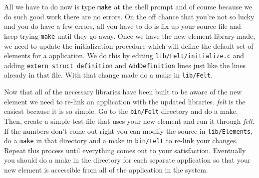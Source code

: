 All we have to do now is type {\tt make} at the shell prompt and of course
because we do such good work there are no errors.  On the off chance
that you're not so lucky and you do have a few errors, all you have to do is 
fix up your source file and keep trying {\tt make} until they go away.
Once we have the new element library made, we need to update the initialization
procedure which will define the default set of elements for a \felt{} 
application.  We do this by editing \mbox{\tt lib/Felt/initialize.c} and 
adding {\tt extern struct definition} and {\tt AddDefinition} lines just
like the lines already in that file.  With that change made do a make
in \mbox{\tt lib/Felt}.

Now that all of the necessary libraries have been built to be aware of the 
new element we need to re-link an application with the updated libraries.  
{\em felt} is the easiest because it is so simple.  Go to the {\tt bin/Felt} 
directory and do a make.  Then, create a simple test file that uses your 
new element and run it through {\em felt}. 
If the numbers don't come out right you can modify the source in 
{\tt lib/Elements}, do a {\tt make} in that directory and a make in
{\tt bin/Felt} to re-link your changes.  Repeat this process until
everything comes out to your satisfaction.  Eventually you should do 
a make in the directory for each separate application so that your new element
is accessible from all of the application in the \felt{} system.
